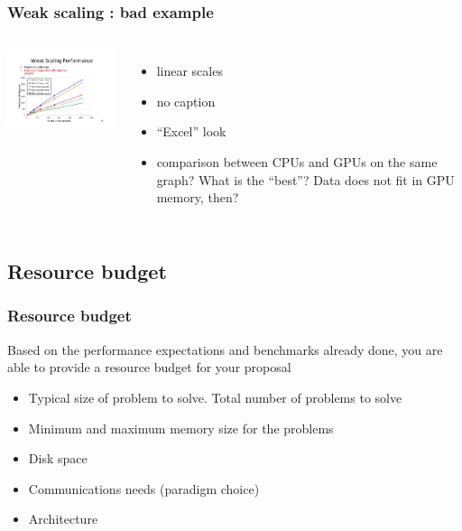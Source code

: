 \begin{frame}[containsverbatim]
	\frametitle{Weak scaling : bad example}

\begin{columns}
\begin{center}
\includegraphics[width=7cm]{Day4/images/weak-bad.png}
\end{center}

\begin{itemize}
	\item {linear scales}
	\item {no caption}
	\item {``Excel'' look}
	\item {comparison between CPUs and GPUs on the same graph? What is the ``best''? Data does not fit in GPU memory, then?}
\end{itemize}
\end{columns}

\end{frame}



\subsection{Resource budget}


\begin{frame}[containsverbatim]
	\frametitle{Resource budget}

Based on the performance expectations and benchmarks already done, you are able to provide a resource budget for your proposal

\begin{itemize}
	\item { Typical size of problem to solve. Total number of problems to solve }
	\item { Minimum and maximum memory size for the problems }
	\item { Disk space }
	\item { Communications needs (paradigm choice) }
	\item { Architecture }
\end{itemize}
\end{frame}





